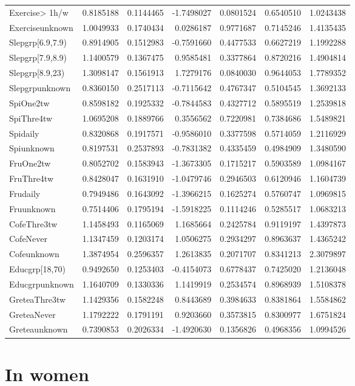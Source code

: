 \documentclass[]{article}
\begin{document}
\begin{longtable}[]{@{}lrrrrrr@{}}
Exercise\textgreater{} 1h/w & 0.8185188 & 0.1144465 & -1.7498027 &
0.0801524 & 0.6540510 & 1.0243438\tabularnewline
Exerciseunknown & 1.0049933 & 0.1740434 & 0.0286187 & 0.9771687 &
0.7145246 & 1.4135435\tabularnewline
Slepgrp{[}6.9,7.9) & 0.8914905 & 0.1512983 & -0.7591660 & 0.4477533 &
0.6627219 & 1.1992288\tabularnewline
Slepgrp{[}7.9,8.9) & 1.1400579 & 0.1367475 & 0.9585481 & 0.3377864 &
0.8720216 & 1.4904814\tabularnewline
Slepgrp{[}8.9,23) & 1.3098147 & 0.1561913 & 1.7279176 & 0.0840030 &
0.9644053 & 1.7789352\tabularnewline
Slepgrpunknown & 0.8360150 & 0.2517113 & -0.7115642 & 0.4767347 &
0.5104545 & 1.3692133\tabularnewline
SpiOne2tw & 0.8598182 & 0.1925332 & -0.7844583 & 0.4327712 & 0.5895519 &
1.2539818\tabularnewline
SpiThre4tw & 1.0695208 & 0.1889766 & 0.3556562 & 0.7220981 & 0.7384686 &
1.5489821\tabularnewline
Spidaily & 0.8320868 & 0.1917571 & -0.9586010 & 0.3377598 & 0.5714059 &
1.2116929\tabularnewline
Spiunknown & 0.8197531 & 0.2537893 & -0.7831382 & 0.4335459 & 0.4984909
& 1.3480590\tabularnewline
FruOne2tw & 0.8052702 & 0.1583943 & -1.3673305 & 0.1715217 & 0.5903589 &
1.0984167\tabularnewline
FruThre4tw & 0.8428047 & 0.1631910 & -1.0479746 & 0.2946503 & 0.6120946
& 1.1604739\tabularnewline
Frudaily & 0.7949486 & 0.1643092 & -1.3966215 & 0.1625274 & 0.5760747 &
1.0969815\tabularnewline
Fruunknown & 0.7514406 & 0.1795194 & -1.5918225 & 0.1114246 & 0.5285517
& 1.0683213\tabularnewline
CofeThre3tw & 1.1458493 & 0.1165069 & 1.1685664 & 0.2425784 & 0.9119197
& 1.4397873\tabularnewline
CofeNever & 1.1347459 & 0.1203174 & 1.0506275 & 0.2934297 & 0.8963637 &
1.4365242\tabularnewline
Cofeunknown & 1.3874954 & 0.2596357 & 1.2613835 & 0.2071707 & 0.8341213
& 2.3079897\tabularnewline
Educgrp{[}18,70) & 0.9492650 & 0.1253403 & -0.4154073 & 0.6778437 &
0.7425020 & 1.2136048\tabularnewline
Educgrpunknown & 1.1640709 & 0.1330336 & 1.1419919 & 0.2534574 &
0.8968939 & 1.5108378\tabularnewline
GreteaThre3tw & 1.1429356 & 0.1582248 & 0.8443689 & 0.3984633 &
0.8381864 & 1.5584862\tabularnewline
GreteaNever & 1.1792222 & 0.1791191 & 0.9203660 & 0.3573815 & 0.8300977
& 1.6751824\tabularnewline
Greteaunknown & 0.7390853 & 0.2026334 & -1.4920630 & 0.1356826 &
0.4968356 & 1.0994526\tabularnewline
\bottomrule
\end{longtable}

\hypertarget{in-women-4}{%
\section{In women}\label{in-women-4}}
\end{document}

